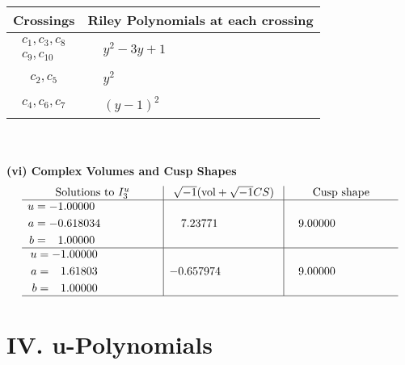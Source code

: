 \documentclass[1p]{elsarticle_modified}
\theoremstyle{definition}
\newcommand{\I}{\sqrt{-1}}
\begin{document}
\begin{tabular}{m{50pt}|m{274pt}}
Crossings & \hspace{64pt}Riley Polynomials at each crossing \\
\hline $$\begin{aligned}c_{1},c_{3},c_{8}\\c_{9},c_{10}\end{aligned}$$&$\begin{aligned}
&y^2-3 y+1
\end{aligned}$\\
\hline $$\begin{aligned}c_{2},c_{5}\end{aligned}$$&$\begin{aligned}
&y^2
\end{aligned}$\\
\hline $$\begin{aligned}c_{4},c_{6},c_{7}\end{aligned}$$&$\begin{aligned}
&(y-1)^2
\end{aligned}$\\
\hline
\end{tabular}\\~\\
\newpage\flushleft \textbf{(vi) Complex Volumes and Cusp Shapes}
$$\begin{array}{c|c|c}  
\text{Solutions to }I^u_{3}& \I (\text{vol} + \sqrt{-1}CS) & \text{Cusp shape}\\
 \hline 
\begin{aligned}
u &= -1.00000\phantom{ +0.000000I} \\
a &= -0.618034\phantom{ +0.000000I} \\
b &= \phantom{-}1.00000\phantom{ +0.000000I}\end{aligned}
 & \phantom{-}7.23771\phantom{ +0.000000I} & \phantom{-}9.00000\phantom{ +0.000000I} \\ \hline\begin{aligned}
u &= -1.00000\phantom{ +0.000000I} \\
a &= \phantom{-}1.61803\phantom{ +0.000000I} \\
b &= \phantom{-}1.00000\phantom{ +0.000000I}\end{aligned}
 & -0.657974\phantom{ +0.000000I} & \phantom{-}9.00000\phantom{ +0.000000I}\\
 \hline 
 \end{array}$$\newpage
\newpage\renewcommand{\arraystretch}{1}
\centering \section*{ IV. u-Polynomials}
\end{document}
